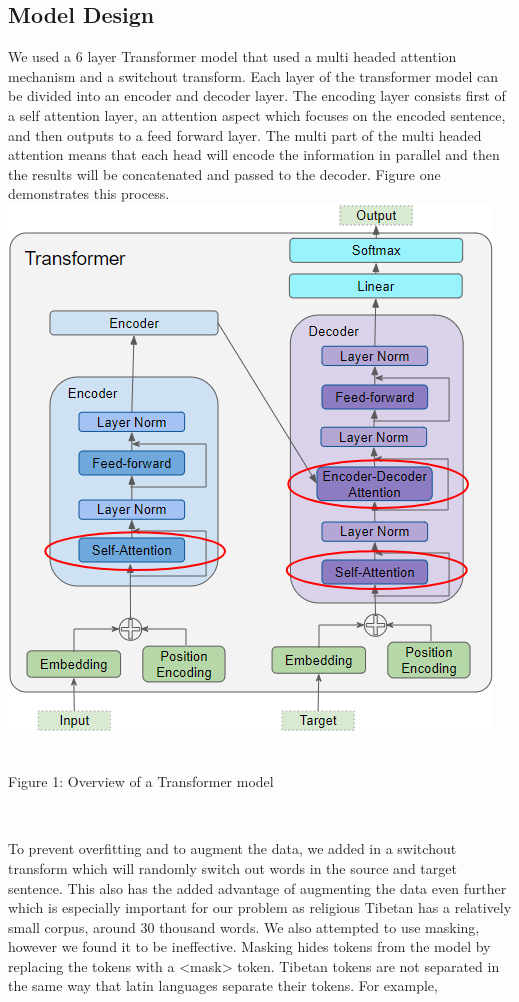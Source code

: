 \documentclass[letterpaper, 12 pt, conference]{ieeeconf}  %
\begin{document}
\subsection{Model Design}
We used a 6 layer Transformer model that used a multi headed attention mechanism and a switchout transform. Each layer of the transformer model can be divided into an encoder and decoder layer. The encoding layer consists first of a self attention layer, an attention aspect which focuses on the encoded sentence, and then outputs to a feed forward layer. The multi part of the multi headed attention means that each head will encode the information in parallel and then the results will be concatenated and passed to the decoder. Figure one demonstrates this process.
\includegraphics[scale=.4]{Transformer.png}
\caption{\\Figure 1: Overview of a Transformer model}
\\
\par
To prevent overfitting and to augment the data, we added in a switchout transform which will randomly switch out words in the source and target sentence. This also has the added advantage of augmenting the data even further which is especially important for our problem as religious Tibetan has a relatively small corpus, around 30 thousand words. We also attempted to use masking, however we found it to be ineffective. Masking hides tokens from the model by replacing the tokens with a <mask> token. Tibetan tokens are not separated in the same way that latin languages separate their tokens. For example,
\end{document}
